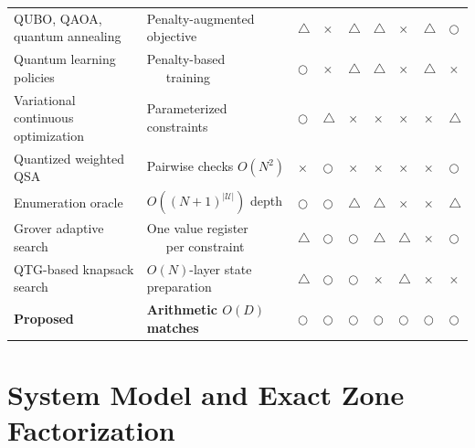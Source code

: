 \documentclass[journal]{IEEEtran}
\begin{document}
{{\begin{table}[!t]
\begin{tabular}{@{}M{2.7cm} M{2.3cm} M{1.55cm} M{1.55cm} M{1.8cm}
     M{1.55cm} M{1.7cm} M{1.55cm} M{1.55cm}@{}}
QUBO, QAOA, quantum annealing
 \cite{farhi2014,lucas2014,kadowaki1998,zhang2024tnse,wei2024tnse} &
Penalty-augmented objective &
$\triangle$ &
$\times$ &
$\triangle$ &
$\triangle$ &
$\times$ &
$\triangle$ &
$\bigcirc$ \\

Quantum learning policies
 \cite{narottama2022qnn,ansere2024qdrl,ansere2026tnse} &
Penalty-based ~~~training &
$\bigcirc$ &
$\times$ &
$\triangle$ &
$\triangle$ &
$\times$ &
$\triangle$ &
$\times$ \\

Variational continuous optimization
 \cite{zhang2024beamforming,sharma2026tnse} &
Parameterized constraints &
$\bigcirc$ &
$\triangle$ &
$\times$ &
$\times$ &
$\times$ &
$\times$ &
$\triangle$ \\

Quantized weighted QSA
 \cite{seo2022} &
Pairwise checks $O(N^2)$ &
$\times$ &
$\bigcirc$ &
$\times$ &
$\times$ &
$\times$ &
$\times$ &
$\bigcirc$ \\

Enumeration oracle
 \cite{jang2025cqf} &
$O((N+1)^{|\mathcal{U}|})$ depth &
$\bigcirc$ &
$\bigcirc$ &
$\triangle$ &
$\triangle$ &
$\times$ &
$\times$ &
$\triangle$ \\

Grover adaptive search
 \cite{gilliam2021gas,fujiwara2025gas} &
One value register ~~~per constraint &
$\triangle$ &
$\bigcirc$ &
$\bigcirc$ &
$\triangle$ &
$\triangle$ &
$\times$ &
$\bigcirc$ \\

QTG-based knapsack search
 \cite{wilkening2025qtg,wilkening2025qkp} &
$O(N)$-layer state preparation &
$\triangle$ &
$\bigcirc$ &
$\bigcirc$ &
$\times$ &
$\triangle$ &
$\times$ &
$\times$ \\

\textbf{Proposed} &
\textbf{Arithmetic \qquad $O(D)$ matches} &
$\bigcirc$ &
$\bigcirc$ &
$\bigcirc$ &
$\bigcirc$ &
$\bigcirc$ &
$\bigcirc$ &
$\bigcirc$ \\

\bottomrule
\end{tabular}
\end{table}
}

}


\section{System Model and Exact Zone Factorization}
\label{sec:formulation}
\end{document}
